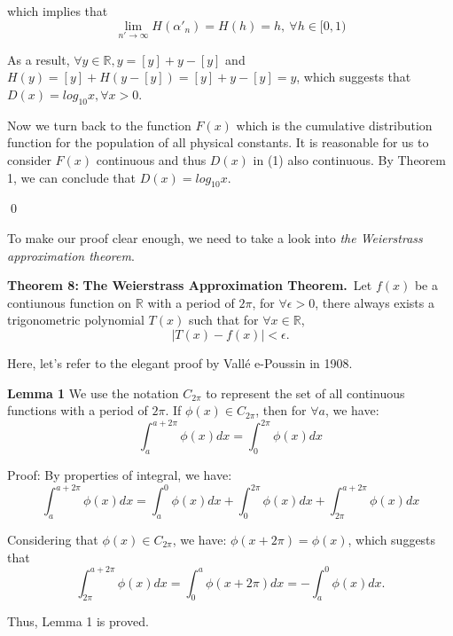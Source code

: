 \documentclass[12pt]{article}
\begin{document}
which implies that
\begin{equation*}
\lim_{n'\to\infty}H(\alpha'_n)=H(h)=h,\ \forall h\in [0,1)
\end{equation*}
\par As a result, $\forall y \in \mathbb{R}, y=[y]+y-[y]$ and $H(y)=[y]+H(y-[y])=[y]+y-[y]=y$, which suggests that $D(x)=log_{10}x, \forall x>0.$
\par Now we turn back to the function $F(x)$ which is the cumulative distribution function for the population of all physical constants. It is reasonable for us to consider $F(x)$ continuous and thus $D(x)$ in (1) also continuous. By Theorem 1, we can conclude that $D(x)=log_{10}x$.
\par \qed
\\
\par To make our proof clear enough, we need to take a look into \emph{the Weierstrass approximation theorem}.
\par {\textbf{Theorem 8:}} {\textbf{The Weierstrass Approximation Theorem.}}\ Let $f(x)$ be a contiunous function on $\mathbb{R}$ with a period of $2\pi$, for $\forall\epsilon>0$, there always exists a trigonometric polynomial $T(x)$ such that for $\forall x\in \mathbb{R}$, 
\begin{equation*}
|T(x)-f(x)|<\epsilon.
\end{equation*}
\par Here, let's refer to the elegant proof by Vall\'{e }e-Poussin in 1908.
\par{\textbf{Lemma 1}} We use the notation $C_{2\pi}$ to represent the set of all continuous functions with a period of $2\pi$. If $\phi(x)\in C_{2\pi}$, then for $\forall a$, we have:
\begin{equation*}
\int_{a}^{a+2\pi}\phi(x)dx=\int_{0}^{2\pi}\phi(x)dx
\end{equation*}
\par Proof: By properties of integral, we have:
\begin{equation*}
\int_{a}^{a+2\pi}\phi(x)dx=\int_{a}^{0}\phi(x)dx+\int_{0}^{2\pi}\phi(x)dx+\int_{2\pi}^{a+2\pi}\phi(x)dx
\end{equation*}
\par Considering that $\phi(x)\in C_{2\pi}$, we have: $\phi(x+2\pi)=\phi(x)$, which suggests that
\begin{equation*}
\int_{2\pi}^{a+2\pi}\phi(x)dx=\int_{0}^{a}\phi(x+2\pi)dx=-\int_{a}^{0}\phi(x)dx.
\end{equation*}
\par Thus, Lemma 1 is proved.
\end{document}
